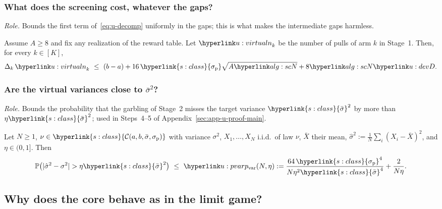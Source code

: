\documentclass[11pt]{article}
\newcommand{\dt}[1]{\hypertarget{#1}{}}
\DeclareRobustCommand{\sy}[2]{{\hyperlink{#1}{#2}}}
\renewcommand{\P}{\mathbb{P}}
\newcommand{\1}{\mathbf{1}}
\newcommand{\Cab}{\sy{s:class}{\mathcal C(a,b,\bar\sigma,\sigma_{\mathrm p})}}
\newcommand{\sbar}{\sy{s:class}{\bar\sigma}}
\newcommand{\sigp}{\sy{s:class}{\sigma_{\mathrm p}}}
\begin{document}
\subsubsection*{What does the screening cost, whatever the gaps?}

\begin{lemma}\label{lem:u-cost}
\textit{Role.} Bounds the first term of~\eqref{eq:u-decomp} uniformly in the gaps; this is what makes the intermediate gaps harmless.

\noindent Assume $A\ge8$ and fix any realization of the reward table. Let $\upulls_k$ be the number of pulls of arm $k$ in Stage~1. Then, for every $k\in[K]$,
\[
\Delta_k\,\upulls_k\ \le\ (b-a)+16\,\sigp\sqrt{A\uN}+8\uN\uD .
\]
\end{lemma}

\subsubsection*{Are the virtual variances close to $\bar\sigma^2$?}

\begin{lemma}\label{lem:u-var}\dt{u:pvar}
\textit{Role.} Bounds the probability that the garbling of Stage~2 misses the target variance $\sbar^2$ by more than $\eta\sbar^2$; used in Steps~4--5 of
Appendix~\ref{sec:app-u-proof-main}.

\noindent Let $N\ge1$, $\nu\in\Cab$ with variance $\sigma^2$, $X_1,\dots,X_N$ i.i.d.\ of law $\nu$, $\bar X$ their mean, $\hat\sigma^2:=\frac1N\sum_i(X_i-\bar X)^2$, and
$\eta\in(0,1]$. Then
\[
\P\big(|\hat\sigma^2-\sigma^2|>\eta\sbar^2\big)\ \le\ \upv(N,\eta):=\frac{64\,\sigp^4}{N\eta^2\sbar^4}+\frac2{N\eta}.
\]
\end{lemma}

\subsection{Why does the core behave as in the limit game?}\label{sec:app-u-transfer}
\end{document}
